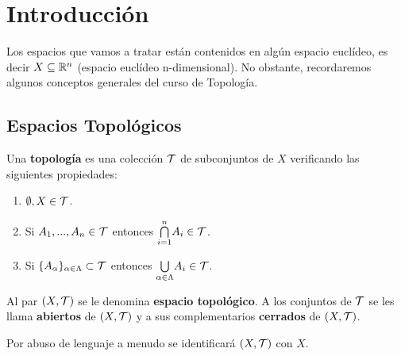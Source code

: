 \documentclass[GTS.tex]{subfiles}
\begin{document}

\renewcommand\chaptername{\Huge Tema}

\titleformat{\chapter}[display]
    {\normalfont\huge\bfseries}{\chaptertitlename\ \thechapter}{10pt}{\Huge}
\titlespacing*{\chapter}{0pt}{-1cm}{10pt}









\chapter{Introducción}
Los espacios que vamos a tratar están contenidos en algún espacio euclídeo, es decir $X\subseteq\mathbb{R}^n$ (espacio euclídeo n-dimensional). No obstante, recordaremos algunos conceptos generales del curso de Topología.
\section{Espacios Topológicos}
\begin{defi}Una \textbf{topología} es una colección $\mathcal{T}$ de subconjuntos de $X$ verificando las siguientes propiedades:
\begin{enumerate}
\item $\emptyset,X\in\mathcal{T}$.
\item Si $A_1,...,A_n\in\mathcal{T}$ entonces $\underset{i=1}{\overset{n}{\bigcap}} A_i\in\mathcal{T}$.
\item Si $\{A_\alpha\}_{\alpha\in\Lambda}\subset\mathcal{T}$ entonces $\underset{\alpha\in\Lambda}{\bigcup} A_i\in\mathcal{T}$.
\end{enumerate}
Al par $(X,\mathcal{T})$ se le denomina \textbf{espacio topológico}. A los conjuntos de $\mathcal{T}$ se les llama \textbf{abiertos} de $(X,\mathcal{T})$ y a sus complementarios \textbf{cerrados} de $(X,\mathcal{T})$.
\end{defi}
\begin{nota} Por abuso de lenguaje a menudo se identificará $(X,\mathcal{T})$ con $X$.
\end{nota}
\end{document}
